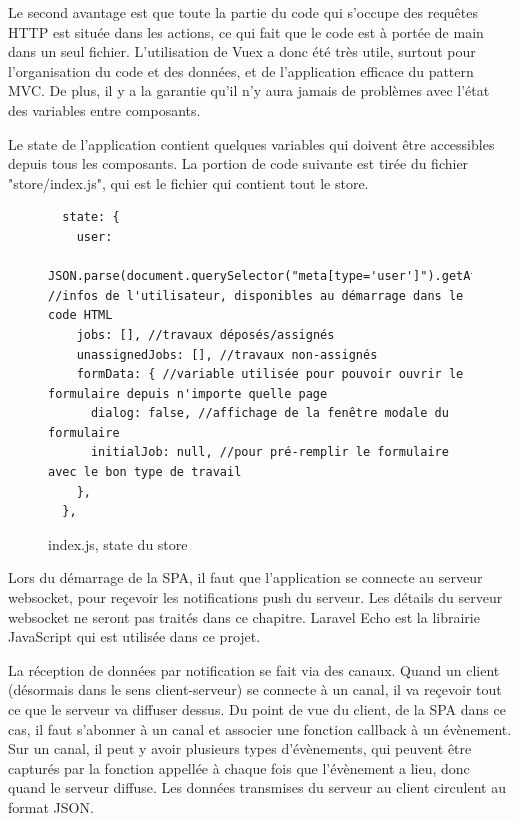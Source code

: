 \documentclass[
    iai, %
    eai, %
]{heig-tb}
\begin{document}

Le second avantage est que toute la partie du code qui s'occupe des requêtes HTTP est située dans les actions, ce qui fait que le code est à portée de main dans un seul fichier.
L'utilisation de Vuex a donc été très utile, surtout pour l'organisation du code et des données, et de l'application efficace du pattern MVC.
De plus, il y a la garantie qu'il n'y aura jamais de problèmes avec l'état des variables entre composants.

Le state de l'application contient quelques variables qui doivent être accessibles depuis tous les composants. La portion de code suivante est tirée du fichier "store/index.js", qui est le fichier qui contient tout le store.

\newpage
\begin{figure}[h]
  \begin{verbatim}
  state: {
    user:
    JSON.parse(document.querySelector("meta[type='user']").getAttribute("value")), //infos de l'utilisateur, disponibles au démarrage dans le code HTML
    jobs: [], //travaux déposés/assignés
    unassignedJobs: [], //travaux non-assignés
    formData: { //variable utilisée pour pouvoir ouvrir le formulaire depuis n'importe quelle page
      dialog: false, //affichage de la fenêtre modale du formulaire
      initialJob: null, //pour pré-remplir le formulaire avec le bon type de travail
    },
  },
  \end{verbatim}
  \caption{index.js, state du store}
\end{figure}

Lors du démarrage de la SPA, il faut que l'application se connecte au serveur websocket, pour reçevoir les notifications push du serveur.
Les détails du serveur websocket ne seront pas traités dans ce chapitre. Laravel Echo est la librairie JavaScript qui est utilisée dans ce projet.

La réception de données par notification se fait via des canaux. Quand un client (désormais dans le sens client-serveur) se connecte à un canal, il va reçevoir tout ce que le serveur va diffuser dessus. Du point de vue du client, de la SPA dans ce cas, il faut s'abonner à un canal et associer une fonction callback à un évènement. Sur un canal, il peut y avoir plusieurs types d'évènements, qui peuvent être capturés par la fonction appellée à chaque fois que l'évènement a lieu, donc quand le serveur diffuse. Les données transmises du serveur au client circulent au format JSON.
\end{document}
